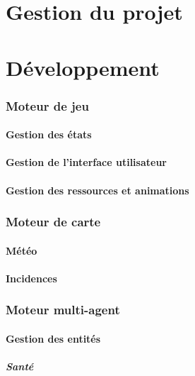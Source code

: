 \documentclass[a4paper]{article}
\begin{document}
  \newpage
  \part{Gestion du projet}

  \newpage
  \part{Développement}
  
	\section{Moteur de jeu}
	
		\subsection{Gestion des états}
		
		\subsection{Gestion de l'interface utilisateur}
		
		\subsection{Gestion des ressources et animations}
		
	\section{Moteur de carte}
	
		\subsection{Météo}
		
		\subsection{Incidences}
		
	\section{Moteur multi-agent}
	
		\subsection{Gestion des entités}
		
			\subsubsection{Santé}
			
\end{document}
